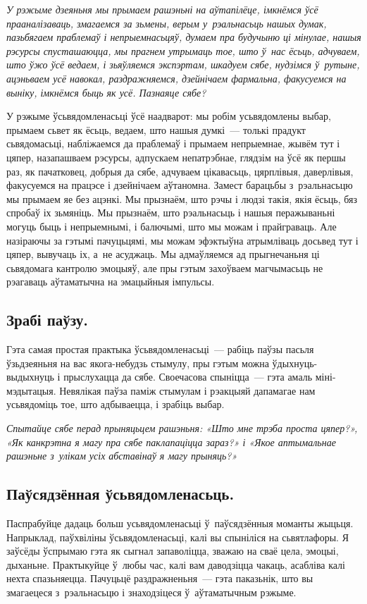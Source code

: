 \emph{У рэжыме дзеяньня мы прымаем рашэньні на аўтапілёце, імкнёмся ўсё прааналізаваць, змагаемся за зьмены, верым у~рэальнасьць нашых думак, пазьбягаем праблемаў і непрыемнасьцяў, думаем пра будучыню ці мінулае, нашыя рэсурсы спусташаюцца, мы прагнем утрымаць тое, што ў~нас ёсьць, адчуваем, што ўжо ўсё ведаем, і зьяўляемся экспэртам, шкадуем сябе, нудзімся ў~рутыне, ацэньваем усё навокал, раздражняемся, дзейнічаем фармальна, факусуемся на выніку, імкнёмся быць як усё. Пазнаяце сябе?}

У рэжыме ўсьвядомленасьці ўсё наадварот: мы робім усьвядомлены выбар, прымаем сьвет як ёсьць, ведаем, што нашыя думкі~--- толькі прадукт сьвядомасьці, набліжаемся да праблемаў і прымаем непрыемнае, жывём тут і цяпер, назапашваем рэсурсы, адпускаем непатрэбнае, глядзім на ўсё як першы раз, як пачатковец, добрыя да сябе, адчуваем цікавасьць, цярплівыя, даверлівыя, факусуемся на працэсе і дзейнічаем аўтаномна. Замест барацьбы з~рэальнасьцю мы прымаем яе без ацэнкі. Мы прызнаём, што рэчы і людзі такія, якія ёсьць, бяз спробаў іх зьмяніць. Мы прызнаём, што рэальнасьць і нашыя перажываньні могуць быць і непрыемнымі, і балючымі, што мы можам і прайграваць. Але назіраючы за гэтымі пачуцьцямі, мы можам эфэктыўна атрымліваць досьвед тут і цяпер, вывучаць іх, а~не асуджаць. Мы адмаўляемся ад прыгнечаньня ці сьвядомага кантролю эмоцыяў, але пры гэтым захоўваем магчымасьць не рэагаваць аўтаматычна на эмацыйныя імпульсы.

\subsection*{Зрабі паўзу.}

Гэта самая простая практыка ўсьвядомленасьці~--- рабіць паўзы пасьля ўзьдзеяньня на вас якога-небудзь стымулу, пры гэтым можна ўдыхнуць-выдыхнуць і прыслухацца да сябе. Своечасова спыніцца~--- гэта амаль міні-мэдытацыя. Невялікая паўза паміж стымулам і рэакцыяй дапамагае нам усьвядоміць тое, што адбываецца, і зрабіць выбар.

\emph{Спытайце сябе перад прыняцьцем рашэньня: «Што мне трэба проста цяпер?», «Як канкрэтна я магу пра сябе паклапаціцца зараз?» і «Якое аптымальнае рашэньне з~улікам усіх абставінаў я магу прыняць?»}

\subsection*{Паўсядзённая ўсьвядомленасьць.}

Паспрабуйце дадаць больш усьвядомленасьці ў~паўсядзённыя моманты жыцьця. Напрыклад, паўхвіліны ўсьвядомленасьці, калі вы спыніліся на сьвятлафоры. Я заўсёды ўспрымаю гэта як сыгнал запаволіцца, зважаю на сваё цела, эмоцыі, дыханьне. Практыкуйце ў~любы час, калі вам даводзіцца чакаць, асабліва калі нехта спазьняецца. Пачуцьцё раздражненьня~--- гэта паказьнік, што вы змагаецеся з~рэальнасьцю і знаходзіцеся ў~аўтаматычным рэжыме.

